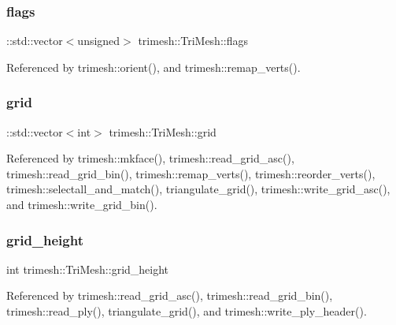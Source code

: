 \subsubsection{\texorpdfstring{flags}{flags}}
{\footnotesize\ttfamily \+::std\+::vector$<$unsigned$>$ trimesh\+::\+Tri\+Mesh\+::flags}



Referenced by trimesh\+::orient(), and trimesh\+::remap\+\_\+verts().

\mbox{\label{classtrimesh_1_1TriMesh_a203a56a248d80adec24dbee460f4e7e3}} 
\subsubsection{\texorpdfstring{grid}{grid}}
{\footnotesize\ttfamily \+::std\+::vector$<$int$>$ trimesh\+::\+Tri\+Mesh\+::grid}



Referenced by trimesh\+::mkface(), trimesh\+::read\+\_\+grid\+\_\+asc(), trimesh\+::read\+\_\+grid\+\_\+bin(), trimesh\+::remap\+\_\+verts(), trimesh\+::reorder\+\_\+verts(), trimesh\+::selectall\+\_\+and\+\_\+match(), triangulate\+\_\+grid(), trimesh\+::write\+\_\+grid\+\_\+asc(), and trimesh\+::write\+\_\+grid\+\_\+bin().

\mbox{\label{classtrimesh_1_1TriMesh_ae441d36a8964b18ba00c1108680c3bdd}} 
\subsubsection{\texorpdfstring{grid\+\_\+height}{grid\_height}}
{\footnotesize\ttfamily int trimesh\+::\+Tri\+Mesh\+::grid\+\_\+height}



Referenced by trimesh\+::read\+\_\+grid\+\_\+asc(), trimesh\+::read\+\_\+grid\+\_\+bin(), trimesh\+::read\+\_\+ply(), triangulate\+\_\+grid(), and trimesh\+::write\+\_\+ply\+\_\+header().

\mbox{\label{classtrimesh_1_1TriMesh_a0ead98ce791baefa44830255873caf81}} 
